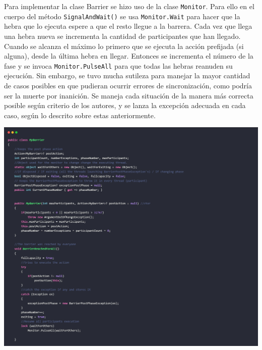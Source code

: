 \documentclass[10pt]{article} %
\newcommand{\csl}[1]{\colorbox{backcolour}{\texttt{#1}}}
\begin{document}
Para implementar la clase Barrier se hizo uso de la clase \csl{Monitor}. Para ello en el cuerpo del m\'etodo \csl{SignalAndWait()} se usa \csl{Monitor.Wait} para hacer que la hebra que lo ejecuta espere a que el resto llegue a la barrera. Cada vez que llega una hebra nueva se incrementa la cantidad de participantes que han llegado. Cuando se alcanza el m\'aximo lo primero que se ejecuta la acci\'on prefijada (si alguna), desde la \'ultima hebra en llegar. Entonces se incrementa el n\'umero de la fase y se invoca \csl{Monitor.PulseAll} para que todas las hebras reanuden su ejecuci\'on. Sin embargo, se tuvo mucha sutileza para manejar la mayor cantidad de casos posibles en que pudieran ocurrir errores de sincronizaci\'on, como podr\'ia ser la muerte por inanici\'on. Se maneja cada situaci\'on de la manera m\'as correcta posible seg\'un criterio de los autores, y se lanza la excepci\'on adecuada en cada caso, seg\'un lo descrito sobre estas anteriormente.

\begin{center}
	\includegraphics[width=15cm]{MyBarrier1.jpg}
\end{center}
\end{document}
